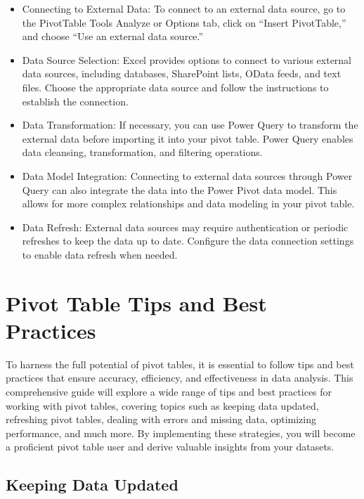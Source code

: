 \documentclass[
]{book}
\begin{document}
\begin{itemize}
\item
  Connecting to External Data: To connect to an external data source, go to the PivotTable Tools Analyze or Options tab, click on ``Insert PivotTable,'' and choose ``Use an external data source.''
\item
  Data Source Selection: Excel provides options to connect to various external data sources, including databases, SharePoint lists, OData feeds, and text files. Choose the appropriate data source and follow the instructions to establish the connection.
\item
  Data Transformation: If necessary, you can use Power Query to transform the external data before importing it into your pivot table. Power Query enables data cleansing, transformation, and filtering operations.
\item
  Data Model Integration: Connecting to external data sources through Power Query can also integrate the data into the Power Pivot data model. This allows for more complex relationships and data modeling in your pivot table.
\item
  Data Refresh: External data sources may require authentication or periodic refreshes to keep the data up to date. Configure the data connection settings to enable data refresh when needed.
\end{itemize}

\hypertarget{pivot-table-tips-and-best-practices}{%
\chapter{Pivot Table Tips and Best Practices}\label{pivot-table-tips-and-best-practices}}

To harness the full potential of pivot tables, it is essential to follow tips and best practices that ensure accuracy, efficiency, and effectiveness in data analysis. This comprehensive guide will explore a wide range of tips and best practices for working with pivot tables, covering topics such as keeping data updated, refreshing pivot tables, dealing with errors and missing data, optimizing performance, and much more. By implementing these strategies, you will become a proficient pivot table user and derive valuable insights from your datasets.

\hypertarget{keeping-data-updated}{%
\section{Keeping Data Updated}\label{keeping-data-updated}}
\end{document}
